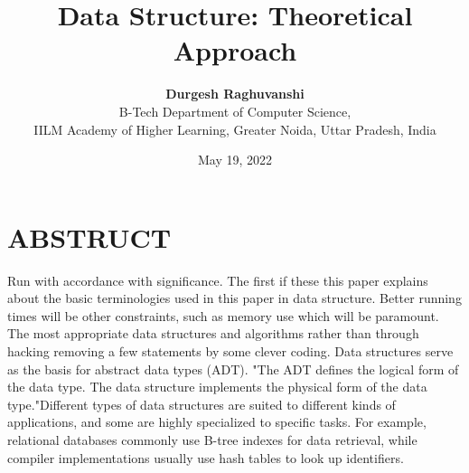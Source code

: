 \documentclass{article}
\title{\textbf{Data Structure: Theoretical Approach}}
\author{\textbf{Durgesh Raghuvanshi}\\B-Tech Department of Computer Science,\\IILM Academy of Higher Learning, Greater Noida, Uttar Pradesh, India\\}
\date{May 19, 2022}
\begin{document}
\maketitle

\section*{ABSTRUCT}
Run with accordance with significance. The first if 
these this paper explains about the basic terminologies 
used in this paper in data structure. Better running 
times will be other constraints, such as memory use 
which will be paramount. The most appropriate data 
structures and algorithms rather than through hacking 
removing a few statements by some clever coding. 
Data structures serve as the basis for abstract data 
types (ADT). "The ADT defines the logical form of 
the data type. The data structure implements the 
physical form of the data type."Different types of data 
structures are suited to different kinds of applications, 
and some are highly specialized to specific tasks. For 
example, relational databases commonly use B-tree 
indexes for data retrieval, while compiler 
implementations usually use hash tables to look up 
identifiers.
\end{document}
